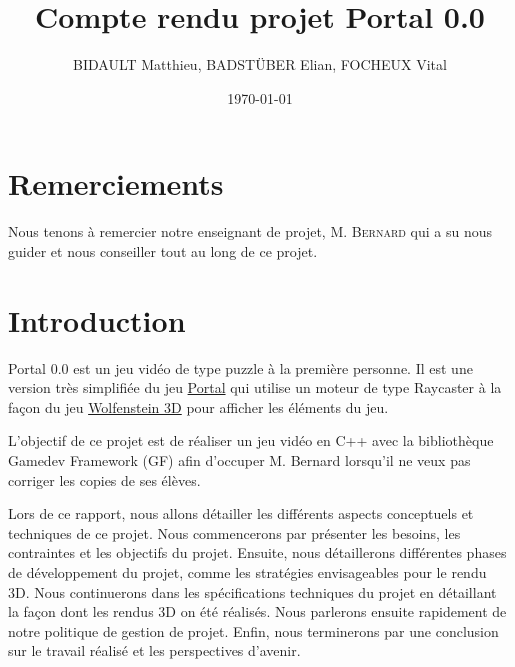\documentclass[11pt]{article}
\title{Compte rendu projet Portal 0.0}
\author{BIDAULT Matthieu, BADSTÜBER Elian, FOCHEUX Vital}
\date{\today}
\begin{document}
\maketitle

\newpage

\section*{Remerciements}

Nous tenons à remercier notre enseignant de projet, M. \textsc{Bernard} 
qui a su nous guider et nous conseiller tout au long de ce projet.

\newpage

\tableofcontents

\newpage

\section{Introduction}

Portal 0.0 est un jeu vidéo de type puzzle à la première personne.
Il est une version très simplifiée du jeu \href{https://fr.wikipedia.org/wiki/Portal_(jeu_vid%C3%A9o)}{Portal}\cite{Portal}
qui utilise un moteur de type Raycaster à la façon du jeu
\href{https://fr.wikipedia.org/wiki/Wolfenstein_3D}{Wolfenstein 3D}\cite{Wolfenstein3D} pour afficher les éléments
du jeu.

L'objectif de ce projet est de réaliser un jeu vidéo en C++ avec la bibliothèque Gamedev Framework\cite{GF} (GF) afin 
d'occuper M. Bernard lorsqu'il ne veux pas corriger les copies de ses élèves.

Lors de ce rapport, nous allons détailler les différents aspects conceptuels et
techniques de ce projet. Nous commencerons par présenter les besoins, les 
contraintes et les objectifs du projet. Ensuite, nous détaillerons différentes phases de 
développement du projet, comme les stratégies envisageables pour le rendu 3D. Nous continuerons
dans les spécifications techniques du projet en détaillant la façon dont les rendus 3D on été
réalisés. Nous parlerons ensuite rapidement de notre politique de gestion de projet. Enfin,
nous terminerons par une conclusion sur le travail réalisé et les perspectives d'avenir.

\end{document}
